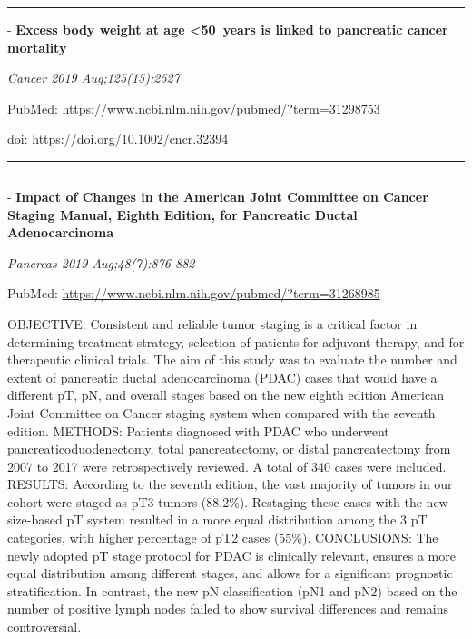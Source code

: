 \documentclass[]{article}
\begin{document}
\begin{center}\rule{0.5\linewidth}{\linethickness}\end{center}

 - \textbf{Excess body weight at age \textless{}50~years is linked to
pancreatic cancer mortality}

\emph{Cancer 2019 Aug;125(15):2527}

PubMed: \url{https://www.ncbi.nlm.nih.gov/pubmed/?term=31298753}

doi: \url{https://doi.org/10.1002/cncr.32394}

{}

{}

\begin{center}\rule{0.5\linewidth}{\linethickness}\end{center}

\begin{center}\rule{0.5\linewidth}{\linethickness}\end{center}

 - \textbf{Impact of Changes in the American Joint Committee on Cancer
Staging Manual, Eighth Edition, for Pancreatic Ductal Adenocarcinoma}

\emph{Pancreas 2019 Aug;48(7):876-882}

PubMed: \url{https://www.ncbi.nlm.nih.gov/pubmed/?term=31268985}

OBJECTIVE: Consistent and reliable tumor staging is a critical factor in
determining treatment strategy, selection of patients for adjuvant
therapy, and for therapeutic clinical trials. The aim of this study was
to evaluate the number and extent of pancreatic ductal adenocarcinoma
(PDAC) cases that would have a different pT, pN, and overall stages
based on the new eighth edition American Joint Committee on Cancer
staging system when compared with the seventh edition. METHODS: Patients
diagnosed with PDAC who underwent pancreaticoduodenectomy, total
pancreatectomy, or distal pancreatectomy from 2007 to 2017 were
retrospectively reviewed. A total of 340 cases were included. RESULTS:
According to the seventh edition, the vast majority of tumors in our
cohort were staged as pT3 tumors (88.2\%). Restaging these cases with
the new size-based pT system resulted in a more equal distribution among
the 3 pT categories, with higher percentage of pT2 cases (55\%).
CONCLUSIONS: The newly adopted pT stage protocol for PDAC is clinically
relevant, ensures a more equal distribution among different stages, and
allows for a significant prognostic stratification. In contrast, the new
pN classification (pN1 and pN2) based on the number of positive lymph
nodes failed to show survival differences and remains controversial.
\end{document}
